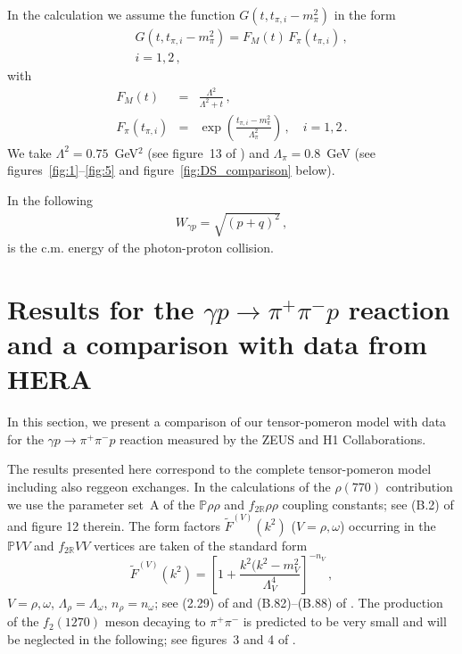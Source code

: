 \documentclass[a4paper,11pt]{article}
\newcommand{\nn}{\nonumber}
\newcommand{\Pom}{\mathbb{P}}
\newcommand{\Reg}{\mathbb{R}}
\begin{document}
In the calculation we assume the function $G(t,t_{\pi,i}-m_{\pi}^{2})$
in the form
%
\begin{eqnarray}
&&G(t,t_{\pi,i}-m_{\pi}^{2}) = F_{M}(t) \, F_{\pi}(t_{\pi,i})\,, \nn \\
&&i = 1,2\,,
\label{A19}
\end{eqnarray}
%
with
%
\begin{eqnarray}
F_{M}(t) &=& \frac{\Lambda^{2}}{\Lambda^{2} + t}\,, 
\label{A20}\\
F_{\pi}(t_{\pi,i}) &=& \exp\left( \frac{t_{\pi,i} - m_{\pi}^{2}}{\Lambda_{\pi}^{2}}\right)\,, \quad i = 1,2\,.
\label{A21}
\end{eqnarray}
%
We take
$\Lambda^{2} = 0.75$~GeV$^{2}$ (see figure~13 of \cite{Lebiedowicz:2025xob})
and  
$\Lambda_{\pi} = 0.8$~GeV (see figures~\ref{fig:1}--\ref{fig:5} and figure~\ref{fig:DS_comparison} below).

In the following
%
\begin{eqnarray}
W_{\gamma p} = \sqrt{(p+q)^{2}} \,,
\label{A22}
\end{eqnarray}
%
is the c.m. energy of the photon-proton collision.

\section{Results for the $\gamma p \to \pi^{+} \pi^{-} p$ reaction and a comparison with data from HERA}
\label{sec:3}

In this section, we present a comparison of our tensor-pomeron model
with data for the $\gamma p \to \pi^{+} \pi^{-} p$ reaction
measured by the ZEUS \cite{ZEUS:1997rof} and H1 \cite{H1:2020lzc} Collaborations.

The results presented here correspond to the complete tensor-pomeron model
including also reggeon exchanges.
In the calculations of the $\rho(770)$ contribution
we use the parameter set~A
of the $\Pom \rho \rho$ and $f_{2 \Reg} \rho \rho$ coupling constants; 
see (B.2) of \cite{Lebiedowicz:2025xob}
and figure 12 therein.
The form factors $\tilde{F}^{(V)}(k^{2})$ ($V = \rho, \omega$)
occurring in the $\Pom VV$ and $f_{2 \Reg} VV$ vertices
are taken of the standard form
%
\begin{equation}
\tilde{F}^{(V)}(k^{2}) = 
\left[ 1 + \frac{k^{2}(k^{2} - m_{V}^{2}}{\Lambda_{V}^{4}} \right]^{-n_{V}}\,,
\label{ff_V}
\end{equation}
%
$V = \rho, \omega$, $\Lambda_{\rho} = \Lambda_{\omega}$,
$n_{\rho} = n_{\omega}$;
see (2.29) of \cite{Lebiedowicz:2025xob}
and (B.82)--(B.88) of \cite{Bolz:2014mya}.
The production of the $f_{2}(1270)$ meson 
decaying to $\pi^{+} \pi^{-}$ is predicted to be very small
and will be neglected in the following;
see figures~3 and 4 of \cite{Bolz:2014mya}.
\end{document}
